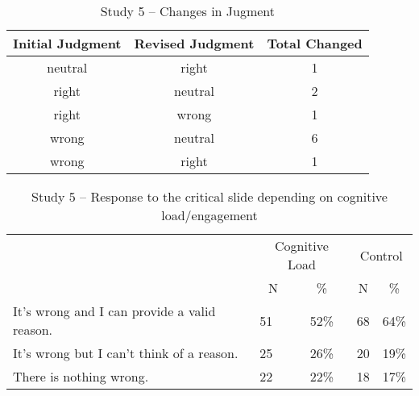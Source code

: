 \documentclass[
  american,
  man,floatsintext]{apa7}
\begin{document}
\begin{table}[tbp]

\begin{center}
\begin{threeparttable}

\caption{\label{tab:tabS5change}Study 5 – Changes in Jugment}

\begin{tabular}{ccc}
\toprule
Initial Judgment & \multicolumn{1}{c}{Revised Judgment} & \multicolumn{1}{c}{Total Changed}\\
\midrule
neutral & right & 1\\
right & neutral & 2\\
right & wrong & 1\\
wrong & neutral & 6\\
wrong & right & 1\\
\bottomrule
\end{tabular}

\end{threeparttable}
\end{center}

\end{table}

\begin{table}[tbp]

\begin{center}
\begin{threeparttable}

\caption{\label{tab:tabS5tab1dumb1all}Study 5 – Response to the critical slide depending on cognitive load/engagement}

\begin{tabular}{llccc}
\toprule
 & \multicolumn{2}{c}{Cognitive Load} & \multicolumn{2}{c}{Control} \\
\cmidrule(r){2-3} \cmidrule(r){4-5}
 & \multicolumn{1}{c}{N} & \multicolumn{1}{c}{\%} & \multicolumn{1}{c}{N} & \multicolumn{1}{c}{\%}\\
\midrule
It's wrong and I can provide a valid reason. & 51 & 52\% & 68 & 64\%\\
It's wrong but I can't think of a reason. & 25 & 26\% & 20 & 19\%\\
There is nothing wrong. & 22 & 22\% & 18 & 17\%\\
\bottomrule
\end{tabular}

\end{threeparttable}
\end{center}

\end{table}
\end{document}
